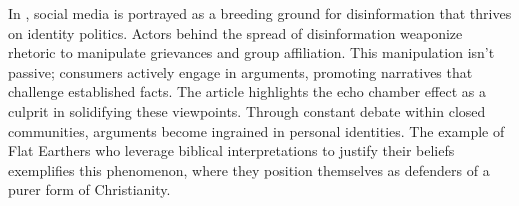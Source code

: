 \documentclass[12pt]{article}
\begin{document}
In \cite{Diaz_2023}, social media is portrayed as a breeding ground for disinformation that thrives on identity politics. 
Actors behind the spread of disinformation weaponize rhetoric to manipulate grievances and group affiliation.  
This manipulation isn't passive; consumers actively engage in arguments, promoting narratives that challenge established facts.  
The article highlights the echo chamber effect as a culprit in solidifying these viewpoints.  
Through constant debate within closed communities, arguments become ingrained in personal identities.  
The example of Flat Earthers who leverage biblical interpretations to justify their beliefs exemplifies this phenomenon, 
where they position themselves as defenders of a purer form of Christianity.



\end{document}
